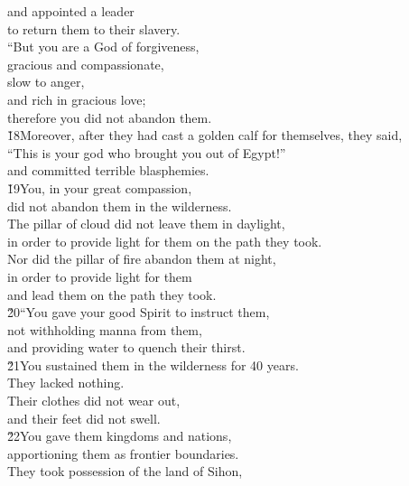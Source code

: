 \begin{poetry}
\poemll    and appointed a leader \\
\poemlll       to return them to their slavery. \\
\poeml ``But you are a God of forgiveness, \\
\poemll    gracious and compassionate, \\
\poeml slow to anger, \\
\poemll    and rich in gracious love; \\
\poemlll       therefore you did not abandon them. \\
\poeml \v{18}Moreover, after they had cast a golden calf for themselves, they said, \\
\poemll    ``This is your god who brought you out of Egypt!'' \\
\poemlll       and committed terrible blasphemies. \\
\poeml \v{19}You, in your great compassion, \\
\poemll    did not abandon them in the wilderness. \\
\poeml The pillar of cloud did not leave them in daylight, \\
\poemll    in order to provide light for them on the path they took. \\
\poeml Nor did the pillar of fire abandon them at night, \\
\poemll    in order to provide light for them \\
\poemlll       and lead them on the path they took. \\
\poeml \v{20}``You gave your good Spirit to instruct them, \\
\poemll    not withholding manna from them, \\
\poemlll       and providing water to quench their thirst. \\
\poeml \v{21}You sustained them in the wilderness for 40 years. \\
\poemll    They lacked nothing. \\
\poeml Their clothes did not wear out, \\
\poemll    and their feet did not swell. \\
\poeml \v{22}You gave them kingdoms and nations, \\
\poemll    apportioning them as frontier boundaries. \\
\poeml They took possession of the land of Sihon, \\

\end{poetry}
